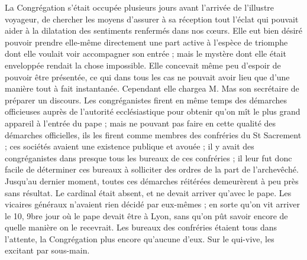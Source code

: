 La Congrégation s'était occupée plusieurs jours avant l'arrivée de l'illustre voyageur, de chercher les moyens d'assurer à sa réception tout l'éclat qui pouvait aider à la dilatation des sentiments renfermés dans nos cœurs. Elle eut bien désiré pouvoir prendre elle-même directement une part active à l'espèce de triomphe dont elle voulait voir accompagner son entrée ; mais le mystère dont elle était enveloppée rendait la chose impossible. Elle concevait même peu d'espoir de pouvoir être présentée, ce qui dans tous les cas ne pouvait avoir lieu que d'une manière tout à fait instantanée. Cependant elle chargea M. Mas son secrétaire de préparer un discours. Les congréganistes firent en même temps des démarches officieuses auprès de l'autorité ecclésiastique pour obtenir qu'on mît le plus grand appareil à l'entrée du pape ; mais ne pouvant
pas faire en cette qualité des démarches officielles, ils les firent comme membres des confréries du St Sacrement ; ces sociétés avaient une existence publique et avouée ; il y avait des congréganistes dans presque tous les bureaux de ces confréries ; il leur fut donc facile de déterminer ces bureaux à solliciter des ordres de la part de l'archevêché. Jusqu'au dernier moment, toutes ces démarches réitérées demeurèrent à peu près sans résultat. Le cardinal était absent, et ne devait arriver qu'avec le pape. Les vicaires généraux n'avaient rien décidé par eux-mêmes ; en sorte qu'on vit arriver le 10, 9bre jour où le pape devait être à Lyon, sans qu'on pût savoir encore de quelle manière on le recevrait. Les bureaux des confréries étaient tous dans l'attente, la Congrégation plus encore qu'aucune d'eux. Sur le qui-vive, les excitant par sous-main.

